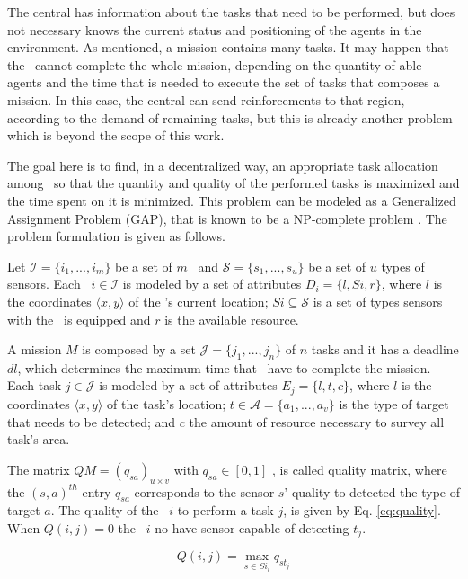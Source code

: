 The central has information about the tasks that need to be performed, but does not necessary knows the current status and positioning of the agents in the environment. As mentioned, a mission contains many tasks. It may happen that the \uavs\ cannot complete the whole mission, depending on the quantity of able agents and the time that is needed to execute the set of tasks that composes a mission. 
In this case, the central can send reinforcements to that region, according to the demand of remaining tasks, but this is already another problem which is beyond the scope of this work.

The goal here is to find, in a decentralized way, an appropriate task allocation among \uavs\
so that the quantity and quality of the performed tasks is maximized and the time spent on it is minimized. This problem can be modeled as a Generalized Assignment Problem (GAP), that is known to be a NP-complete problem \cite{shmoys1993approximation}. The problem formulation is given as follows.

Let 
$\mathcal{I} = \{i_1, ..., i_m\}$ be a set of $m$ \uavs\   and
$\mathcal{S} = \{s_1, ..., s_u\}$ be a set of $u$ types of sensors.
Each \uav\ $i \in \mathcal{I}$ is modeled by a set of attributes $D_i = \{l, Si, r\}$, where 
$l$ is the coordinates $\langle x,y \rangle$ of the \uav's current location; $Si \subseteq \mathcal{S}$ is a set of types sensors with the \uav\ is equipped and $r$ is the available resource.

A mission $M$ is composed by a set $\mathcal{J} = \{j_1, ..., j_n\}$ of $n$ tasks and it has a deadline $dl$, which determines the maximum time that \uavs\ have to complete the mission. Each task $j \in \mathcal{J}$
is modeled by a set of attributes $E_j = \{l, t, c\}$, where $l$ is the coordinates $\langle x,y \rangle$ of the task's location; $t \in \mathcal{A} = \{a_1, ..., a_v\}$ is the type of target that needs to be detected; and $c$ the amount of resource necessary to survey all task's area. 

The matrix $QM = (q_{sa})_{u \times v}$ with $q_{sa} \in [0,1]$
, is called quality matrix, where the $(s,a)^{th}$ entry $q_{sa}$ corresponds to the sensor $s$' quality to detected the type of target $a$. 
The quality of the \uav\ $i$ to perform a task $j$, is given by Eq. \ref{eq:quality}. When $Q(i,j) = 0$ the \uav\ $i$ no have sensor capable of detecting $t_j$.

\begin{equation} \label{eq:quality}
	Q(i,j) = \max_{s \in Si_i}  q_{st_j}
\end{equation}

